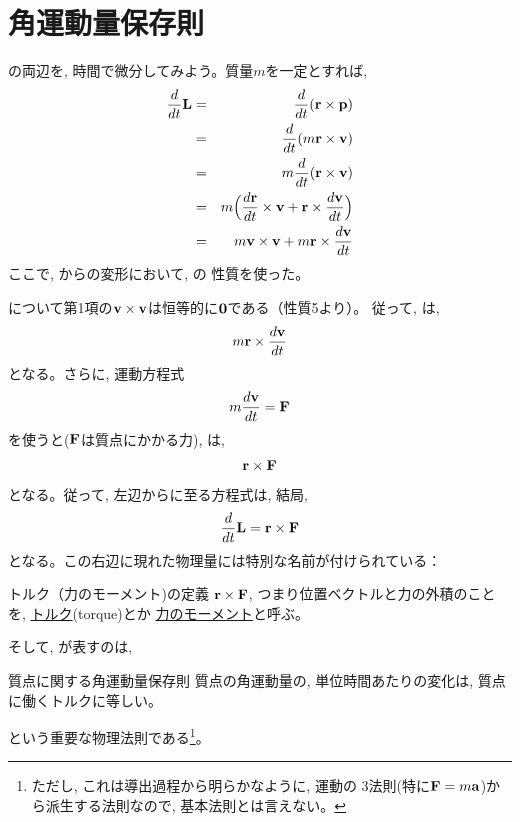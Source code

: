\section{角運動量保存則}

の両辺を, 時間で微分してみよう。質量$m$を一定とすれば, 
\begin{eqnarray}
\frac{d}{dt}{\bf L}&=&\frac{d}{dt}({\bf r}\times {\bf p})\label{eq:dLdt1}\\
                    &=&\frac{d}{dt}(m{\bf r}\times{\bf v})\label{eq:dLdt2}\\
                    &=&m\frac{d}{dt}({\bf r}\times{\bf v})\label{eq:dLdt3}\\
                    &=&m\Bigl(\frac{d{\bf r}}{dt}\times{\bf v}+{\bf r}\times\frac{d{\bf v}}{dt}\Bigr)\label{eq:dLdt4}\\
                    &=&m{\bf v}\times{\bf v}+m{\bf r}\times\frac{d{\bf v}}{dt}\label{eq:dLdt5}
\end{eqnarray}
ここで, からの変形において, の
性質を使った。

について第1項の${\bf v}\times{\bf v}$は恒等的に${\bf 0}$である（性質5より）。
従って, は, 
\begin{eqnarray}
m{\bf r}\times\frac{d{\bf v}}{dt}\label{eq:dLdt6}
\end{eqnarray}
となる。さらに, 運動方程式
\begin{eqnarray}
m\frac{d{\bf v}}{dt}={\bf F}
\end{eqnarray}
を使うと(${\bf F}$は質点にかかる力), は, 
\begin{eqnarray} 
{\bf r}\times{\bf F}
\end{eqnarray} 
となる。従って, 左辺からに至る方程式は, 結局, 
\begin{eqnarray} 
\frac{d}{dt}{\bf L}={\bf r}\times{\bf F}\label{eq:angmomtorq}
\end{eqnarray} 
となる。この右辺に現れた物理量には特別な名前が付けられている：
\begin{itembox}{トルク（力のモーメント)の定義}
${\bf r}\times{\bf F}$, つまり位置ベクトルと力の外積のことを, 
\underline{トルク}(torque)とか
\underline{力のモーメント}と呼ぶ。
\end{itembox}

そして, が表すのは, 
\begin{itembox}{質点に関する角運動量保存則}
質点の角運動量の, 単位時間あたりの変化は, 質点に働くトルクに等しい。
\end{itembox}
という重要な物理法則である\footnote{ただし, これは導出過程から明らかなように, 運動の
3法則(特に${\bf F}=m{\bf a}$)から派生する法則なので, 基本法則とは言えない。}。\mv

